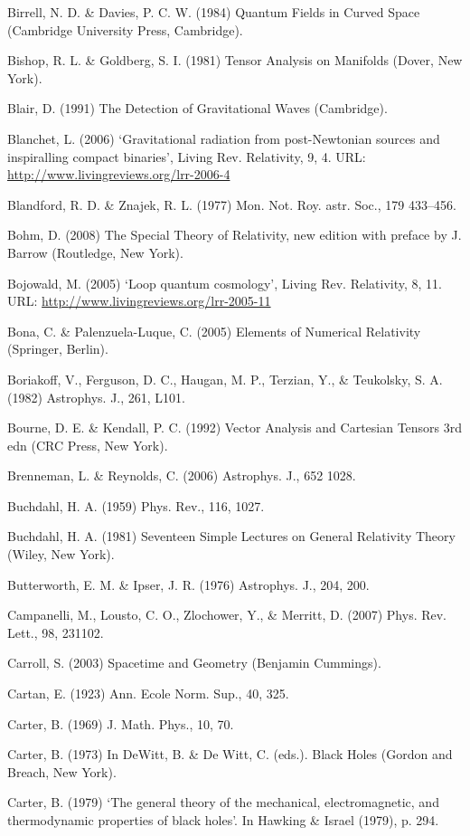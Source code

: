{Birrell, N. D. \& Davies, P. C. W. (1984) Quantum Fields in Curved Space (Cambridge University Press, Cambridge).


Bishop, R. L. \& Goldberg, S. I. (1981) Tensor Analysis on Manifolds (Dover, New York).


Blair, D. (1991) The Detection of Gravitational Waves (Cambridge).


Blanchet, L. (2006) ‘Gravitational radiation from post-Newtonian sources and inspiralling compact binaries’, Living Rev. Relativity, 9, 4. URL: \url{http://www.livingreviews.org/lrr-2006-4}

Blandford, R. D. \& Znajek, R. L. (1977) Mon. Not. Roy. astr. Soc., 179 433–456.


Bohm, D. (2008) The Special Theory of Relativity, new edition with preface by J. Barrow (Routledge, New York).


Bojowald, M. (2005) ‘Loop quantum cosmology’, Living Rev. Relativity, 8, 11. URL: \url{http://www.livingreviews.org/lrr-2005-11}


Bona, C. \& Palenzuela-Luque, C. (2005) Elements of Numerical Relativity (Springer, Berlin).


Boriakoff, V., Ferguson, D. C., Haugan, M. P., Terzian, Y., \& Teukolsky, S. A. (1982) Astrophys. J., 261, L101.


Bourne, D. E. \& Kendall, P. C. (1992) Vector Analysis and Cartesian Tensors 3rd edn  (CRC Press, New York).


Brenneman, L. \& Reynolds, C. (2006) Astrophys. J., 652 1028. 

Buchdahl, H. A. (1959) Phys. Rev., 116, 1027.


Buchdahl, H. A. (1981) Seventeen Simple Lectures on General Relativity Theory (Wiley, New York).


Butterworth, E. M. \& Ipser, J. R. (1976) Astrophys. J., 204, 200. 

Campanelli, M., Lousto, C. O., Zlochower, Y., \& Merritt, D. (2007) Phys. Rev. Lett., 98, 231102.


Carroll, S. (2003) Spacetime and Geometry (Benjamin Cummings).


Cartan, E. (1923) Ann. Ecole Norm. Sup., 40, 325.


Carter, B. (1969) J. Math. Phys., 10, 70.


Carter, B. (1973) In DeWitt, B. \& De Witt, C. (eds.). Black Holes (Gordon and Breach, New York).


Carter, B. (1979) ‘The general theory of the mechanical, electromagnetic, and thermodynamic properties of black holes’. In Hawking \& Israel (1979), p. 294.


}
